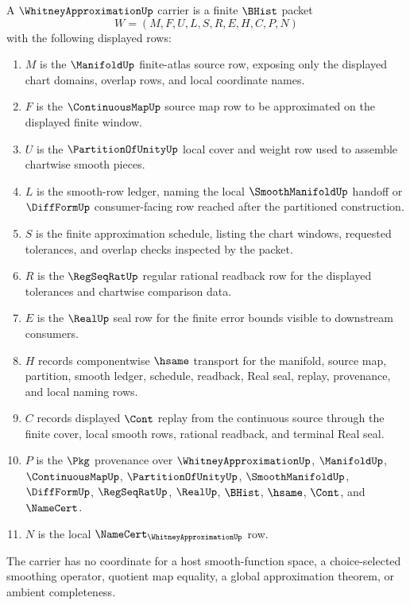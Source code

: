 \begin{definition}
\label{def:whitney-approximation-carrier}
A $\WhitneyApproximationUp$ carrier is a finite $\BHist$ packet
$$
W=(M,F,U,L,S,R,E,H,C,P,N)
$$
with the following displayed rows:
\begin{enumerate}
\item $M$ is the $\ManifoldUp$ finite-atlas source row, exposing only the displayed chart domains, overlap rows, and local coordinate names.
\item $F$ is the $\ContinuousMapUp$ source map row to be approximated on the displayed finite window.
\item $U$ is the $\PartitionOfUnityUp$ local cover and weight row used to assemble chartwise smooth pieces.
\item $L$ is the smooth-row ledger, naming the local $\SmoothManifoldUp$ handoff or $\DiffFormUp$ consumer-facing row reached after the partitioned construction.
\item $S$ is the finite approximation schedule, listing the chart windows, requested tolerances, and overlap checks inspected by the packet.
\item $R$ is the $\RegSeqRatUp$ regular rational readback row for the displayed tolerances and chartwise comparison data.
\item $E$ is the $\RealUp$ seal row for the finite error bounds visible to downstream consumers.
\item $H$ records componentwise $\hsame$ transport for the manifold, source map, partition, smooth ledger, schedule, readback, Real seal, replay, provenance, and local naming rows.
\item $C$ records displayed $\Cont$ replay from the continuous source through the finite cover, local smooth rows, rational readback, and terminal Real seal.
\item $P$ is the $\Pkg$ provenance over $\WhitneyApproximationUp$, $\ManifoldUp$, $\ContinuousMapUp$, $\PartitionOfUnityUp$, $\SmoothManifoldUp$, $\DiffFormUp$, $\RegSeqRatUp$, $\RealUp$, $\BHist$, $\hsame$, $\Cont$, and $\NameCert$.
\item $N$ is the local $\NameCert_{\WhitneyApproximationUp}$ row.
\end{enumerate}
The carrier has no coordinate for a host smooth-function space, a choice-selected smoothing operator, quotient map equality, a global approximation theorem, or ambient completeness.
\end{definition}

